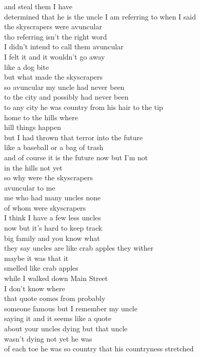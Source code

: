 \begin{flushleft}
\begin{paracol}{3}
and steal them I have\\
determined that he is the uncle I am referring to when I said\\
the skyscrapers were avuncular\\
tho referring isn’t the right word\\
I didn’t intend to call them avuncular\\
I felt it and it wouldn’t go away\\
like a dog bite\\
but what made the skyscrapers\\
so avuncular my uncle had never been\\
to the city and possibly had never been\\
to any city he was country from his hair to the tip\\
\switchcolumn[1]
home to the hills where\\
hill things happen\\
but I had thrown that terror into the future\\
like a baseball or a bag of trash\\
and of course it is the future now but I’m not\\
in the hills not yet\\
so why were the skyscrapers\\
avuncular to me\\
me who had many uncles none\\
of whom were skyscrapers\\
I think I have a few less uncles\\
now but it’s hard to keep track\\
big family and you know what\\
they say uncles are like crab apples they wither\\
maybe it was that it\\
smelled like crab apples\\
while I walked down Main Street\\
I don’t know where\\
that quote comes from probably\\
someone famous but I remember my uncle\\
saying it and it seems like a quote\\
about your uncles dying but that uncle\\
wasn’t dying not yet he was\\
of each toe he was so country that his countryness stretched\\ %

\end{paracol}
\end{flushleft}
